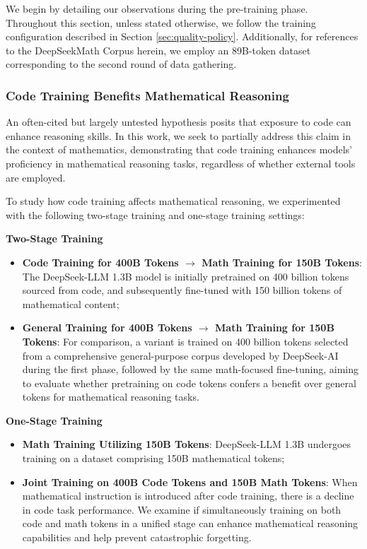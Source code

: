\begin{itemize}[topsep=0pt]
\begin{itemize}[topsep=0pt]
We begin by detailing our observations during the pre-training phase. Throughout this section, unless stated otherwise, we follow the training configuration described in Section \ref{sec:quality-policy}. Additionally, for references to the DeepSeekMath Corpus herein, we employ an 89B-token dataset corresponding to the second round of data gathering.

\subsubsection{Code Training Benefits Mathematical Reasoning}

An often-cited but largely untested hypothesis posits that exposure to code can enhance reasoning skills. In this work, we seek to partially address this claim in the context of mathematics, demonstrating that code training enhances models’ proficiency in mathematical reasoning tasks, regardless of whether external tools are employed.

To study how code training affects mathematical reasoning, we experimented with the following two-stage training and one-stage training settings:

\textbf{Two-Stage Training}

\begin{itemize}[topsep=0pt]
    \item \textbf{Code Training for 400B Tokens $\rightarrow$ Math Training for 150B Tokens}: The DeepSeek-LLM 1.3B model is initially pretrained on 400 billion tokens sourced from code, and subsequently fine-tuned with 150 billion tokens of mathematical content;
    \item \textbf{General Training for 400B Tokens $\rightarrow$ Math Training for 150B Tokens}: For comparison, a variant is trained on 400 billion tokens selected from a comprehensive general-purpose corpus developed by DeepSeek-AI during the first phase, followed by the same math-focused fine-tuning, aiming to evaluate whether pretraining on code tokens confers a benefit over general tokens for mathematical reasoning tasks.
\end{itemize}

\textbf{One-Stage Training}

\begin{itemize}[topsep=0pt]
    \item \textbf{Math Training Utilizing 150B Tokens}: DeepSeek-LLM 1.3B undergoes training on a dataset comprising 150B mathematical tokens;
    \item \textbf{Joint Training on 400B Code Tokens and 150B Math Tokens}: When mathematical instruction is introduced after code training, there is a decline in code task performance. We examine if simultaneously training on both code and math tokens in a unified stage can enhance mathematical reasoning capabilities and help prevent catastrophic forgetting.
\end{itemize}


\end{itemize}
\end{itemize}
